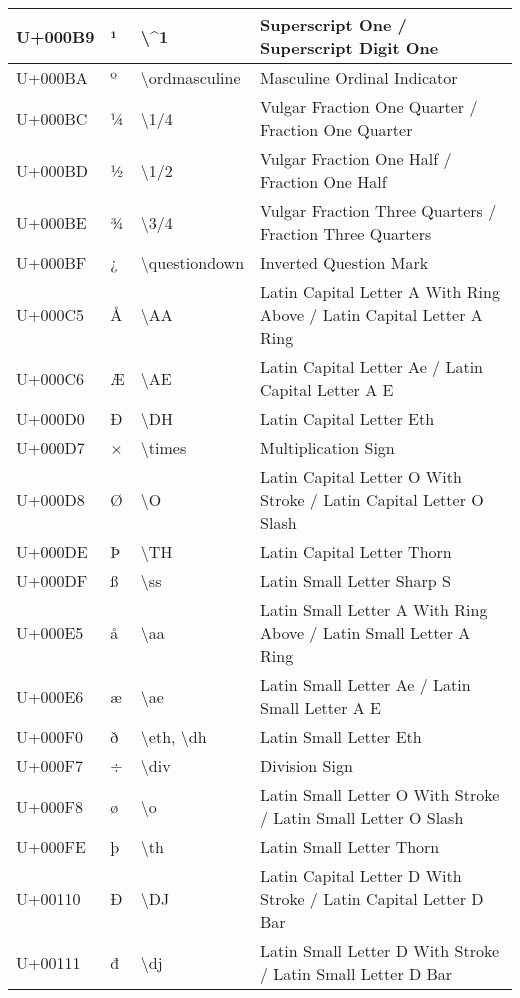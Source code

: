 \begin{table}[h]
\begin{tabulary}{\linewidth}{|L|L|L|L|}
\hline
U+000B9 & ¹ & {\textbackslash}{\textasciicircum}1 & Superscript One / Superscript Digit One \\
\hline
U+000BA & º & {\textbackslash}ordmasculine & Masculine Ordinal Indicator \\
\hline
U+000BC & ¼ & {\textbackslash}1/4 & Vulgar Fraction One Quarter / Fraction One Quarter \\
\hline
U+000BD & ½ & {\textbackslash}1/2 & Vulgar Fraction One Half / Fraction One Half \\
\hline
U+000BE & ¾ & {\textbackslash}3/4 & Vulgar Fraction Three Quarters / Fraction Three Quarters \\
\hline
U+000BF & ¿ & {\textbackslash}questiondown & Inverted Question Mark \\
\hline
U+000C5 & Å & {\textbackslash}AA & Latin Capital Letter A With Ring Above / Latin Capital Letter A Ring \\
\hline
U+000C6 & Æ & {\textbackslash}AE & Latin Capital Letter Ae / Latin Capital Letter A E \\
\hline
U+000D0 & Ð & {\textbackslash}DH & Latin Capital Letter Eth \\
\hline
U+000D7 & × & {\textbackslash}times & Multiplication Sign \\
\hline
U+000D8 & Ø & {\textbackslash}O & Latin Capital Letter O With Stroke / Latin Capital Letter O Slash \\
\hline
U+000DE & Þ & {\textbackslash}TH & Latin Capital Letter Thorn \\
\hline
U+000DF & ß & {\textbackslash}ss & Latin Small Letter Sharp S \\
\hline
U+000E5 & å & {\textbackslash}aa & Latin Small Letter A With Ring Above / Latin Small Letter A Ring \\
\hline
U+000E6 & æ & {\textbackslash}ae & Latin Small Letter Ae / Latin Small Letter A E \\
\hline
U+000F0 & ð & {\textbackslash}eth, {\textbackslash}dh & Latin Small Letter Eth \\
\hline
U+000F7 & ÷ & {\textbackslash}div & Division Sign \\
\hline
U+000F8 & ø & {\textbackslash}o & Latin Small Letter O With Stroke / Latin Small Letter O Slash \\
\hline
U+000FE & þ & {\textbackslash}th & Latin Small Letter Thorn \\
\hline
U+00110 & Đ & {\textbackslash}DJ & Latin Capital Letter D With Stroke / Latin Capital Letter D Bar \\
\hline
U+00111 & đ & {\textbackslash}dj & Latin Small Letter D With Stroke / Latin Small Letter D Bar \\

\end{tabulary}
\end{table}
